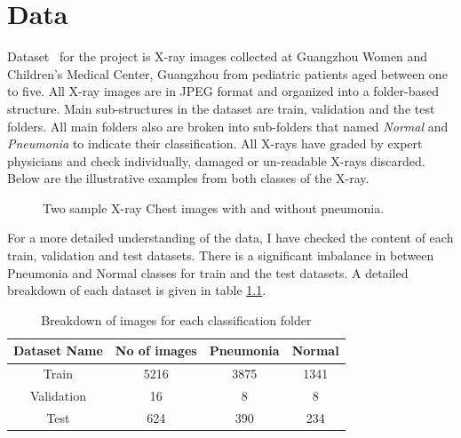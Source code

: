 \chapter{Data} \label{chap:data}
Dataset~\cite{dataset} for the project is X-ray images collected at Guangzhou Women and Children’s Medical Center, Guangzhou from pediatric patients aged between one to five.
All X-ray images are in JPEG format and organized into a folder-based structure.
Main sub-structures in the dataset are train, validation and the test folders.
All main folders also are broken into sub-folders that named \emph{Normal} and \emph{Pneumonia} to indicate their classification.
All X-rays have graded by expert physicians and check individually, damaged or un-readable X-rays discarded.
Below are the illustrative examples from both classes of the X-ray.

\begin{figure}[H]%
    \centering
    \qquad
    \caption{Two sample X-ray Chest images with and without pneumonia.}%
    \label{fig:sample}%
\end{figure}

For a more detailed understanding of the data, I have checked the content of each train, validation and test datasets. 
There is a significant imbalance in between Pneumonia and Normal classes for train and the test datasets.
A detailed breakdown of each dataset is given in table \ref{table:dataset}.


\begin{table}[H]
    \centering
    \begin{tabular}{||c c c c||} 
    \hline
    Dataset Name & No of images & Pneumonia & Normal \\ [0.5ex] 
    \hline\hline
    Train & 5216 & 3875 & 1341 \\ 
    \hline
    Validation & 16 & 8 & 8 \\
    \hline
    Test & 624 & 390 & 234 \\ [1ex] 
    \hline
    \end{tabular}
    \caption{Breakdown of images for each classification folder}
    \label{table:dataset}
\end{table}



